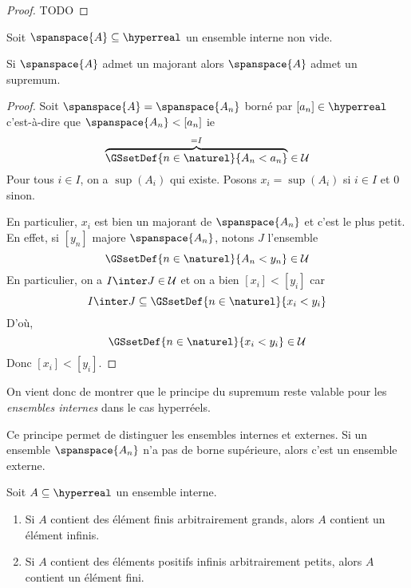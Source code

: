 \documentclass[a4paper, 12pt]{report}
\begin{document}
\ifdefined\outputproof
\begin{proof}
	TODO
\end{proof}
\fi

\begin{proposition}
	Soit $\spanspace{A} \subseteq \hyperreal$ un ensemble interne non vide.

	Si $\spanspace{A}$ admet un majorant alors $\spanspace{A}$ admet un supremum.
\end{proposition}

\begin{proof}
	Soit $\spanspace{A} = \spanspace{A_{n}}$ borné par $[a_{n}] \in \hyperreal$
	c'est-à-dire que $\spanspace{A_{n}} < [a_{n}]$ ie
	\begin{equation}
		\overbrace{\GSsetDef{n \in \naturel}{A_{n} < a_{n}}}^{= I} \in \mathcal{U}
	\end{equation}
	Pour tous $i \in I$, on a $\sup(A_{i})$ qui existe.
	Posons $x_{i} = \sup(A_{i})$ si $i \in I$ et $0$ sinon.

	En particulier, $x_{i}$ est bien un majorant de $\spanspace{A_{n}}$ et c'est
	le plus petit. En effet, si $[y_{n}]$ majore $\spanspace{A_{n}}$, notons $J$
	l'ensemble
	\begin{equation}
		\GSsetDef{n \in \naturel}{A_{n} < y_{n}} \in \mathcal{U}
	\end{equation}
	En particulier, on a $I \inter J \in \mathcal{U}$ et on a bien $[x_{i}] <
	[y_{i}]$ car
	\begin{equation}
		I \inter J \subseteq \GSsetDef{n \in \naturel}{x_{i} < y_{i}}
	\end{equation}
	D'où,
	\begin{equation}
		\GSsetDef{n \in \naturel}{x_{i} < y_{i}} \in \mathcal{U}
	\end{equation}
	Donc $[x_{i}] < [y_{i}]$.
\end{proof}

On vient donc de montrer que le principe du supremum reste valable pour les
\textit{ensembles internes} dans le cas hyperréels.

Ce principe permet de distinguer les ensembles internes et externes. Si un
ensemble $\spanspace{A_{n}}$ n'a pas de borne supérieure, alors c'est un
ensemble externe.

\begin{proposition}
	Soit $A \subseteq \hyperreal$ un ensemble interne.

	\begin{enumerate}
		\item Si $A$ contient des élément finis arbitrairement grands, alors $A$
			contient un élément infinis.
		\item Si $A$ contient des éléments positifs infinis arbitrairement
			petits, alors $A$ contient un élément fini.
	\end{enumerate}
\end{proposition}
\end{document}
